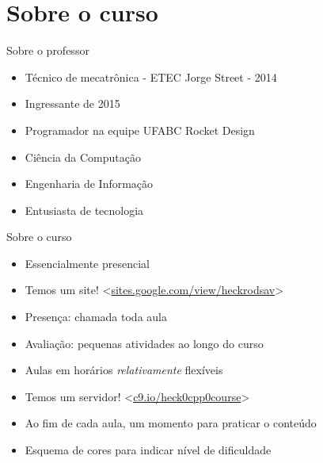 \documentclass[11pt]{beamer}
\subtitle{Introducto}
\begin{document}
\titlepage

\begin{frame}
	\tableofcontents
\end{frame}

\section{Sobre o curso}
	\begin{frame}{Sobre o professor}
		\begin{itemize}
			\presentationPause\item Técnico de mecatrônica - ETEC Jorge Street - 2014
			\presentationPause\item Ingressante de 2015
			\presentationPause\item Programador na equipe UFABC Rocket Design
			\presentationPause\item Ciência da Computação
			\presentationPause\item Engenharia de Informação
			\presentationPause\item Entusiasta de tecnologia
		\end{itemize}
	\end{frame}	


	\begin{frame}{Sobre o curso}
		\begin{itemize}
			\presentationPause\item Essencialmente presencial
			\presentationPause\item Temos um site! <\href{https://sites.google.com/view/heckrodsav}{sites.google.com/view/heckrodsav}>
			\presentationPause\item Presença: chamada toda aula
			\presentationPause\item Avaliação: pequenas atividades ao longo do curso
			\presentationPause\item Aulas em horários {\itshape relativamente} flexíveis
			\presentationPause\item Temos um servidor! <\href{https://c9.io/heck0cpp0course}{c9.io/heck0cpp0course}>
			\presentationPause\item Ao fim de cada aula, um momento para praticar o conteúdo
			\presentationPause\item Esquema de cores para indicar nível de dificuldade
		\end{itemize}
		\begin{center}
			\palette
		\end{center}
	\end{frame}	
\end{document}
